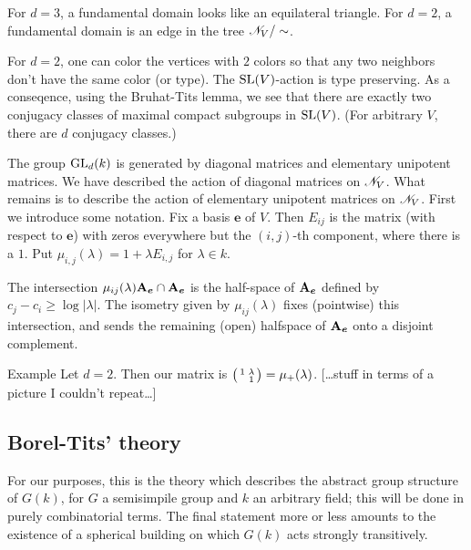 For $d=3$, a fundamental domain looks like an equilateral triangle. For 
$d=2$, a fundamental domain is an edge in the tree 
$\mathscr{N}_V/\sim$. 

For $d=2$, one can color the vertices with $2$ colors so that any two neighbors 
don't have the same color (or type). The 
$\operatorname{SL}(V)$-action is type preserving. As a conseqence, using 
the Bruhat-Tits lemma, we see that there are exactly two conjugacy classes of 
maximal compact subgroups in $\operatorname{SL}(V)$. (For arbitrary $V$, there are 
$d$ conjugacy classes.) 

The group $\operatorname{GL}_d(k)$ is generated by diagonal matrices and elementary 
unipotent matrices. We have described the action of diagonal matrices on 
$\mathscr{N}_V$. What remains is to describe the action of elementary unipotent matrices 
on $\mathscr{N}_V$. First we introduce some notation. Fix a basis 
$\boldsymbol e$ of $V$. Then $E_{i j}$ is the matrix (with respect to 
$\boldsymbol e$) with zeros everywhere but the $(i,j)$-th component, where there 
is a $1$. Put $\mu_{i,j}(\lambda) = 1+\lambda E_{i,j}$ for 
$\lambda\in k$. 

\begin{prop}
The intersection 
$\mu_{i j}(\lambda) \mathbf{A}_{\boldsymbol e} \cap \mathbf{A}_{\boldsymbol e}$ is the half-space 
of $\mathbf{A}_{\boldsymbol e}$ defined by 
$c_j-c_i \geqslant \log |\lambda|$. The isometry given by 
$\mu_{i j}(\lambda)$ fixes (pointwise) this intersection, and sends the remaining 
(open) halfspace of $\mathbf{A}_{\boldsymbol e}$ onto a disjoint complement. 
\end{prop}

\begin{enonce}[remark]{Example}
Let $d=2$. Then our matrix is $\bigl(\begin{smallmatrix} 1 & \lambda \\  & 1 \end{smallmatrix} \bigr) = \mu_+(\lambda)$. 
[\ldots stuff in terms of a picture I couldn't repeat\ldots]
\end{enonce}





\subsection{Borel-Tits' theory}

For our purposes, this is the theory which describes the abstract group structure 
of $G(k)$, for $G$ a semisimpile group and $k$ an arbitrary field; this will be done in 
purely combinatorial terms. The final statement more or less amounts to the existence 
of a spherical building on which $G(k)$ acts strongly transitively. 



